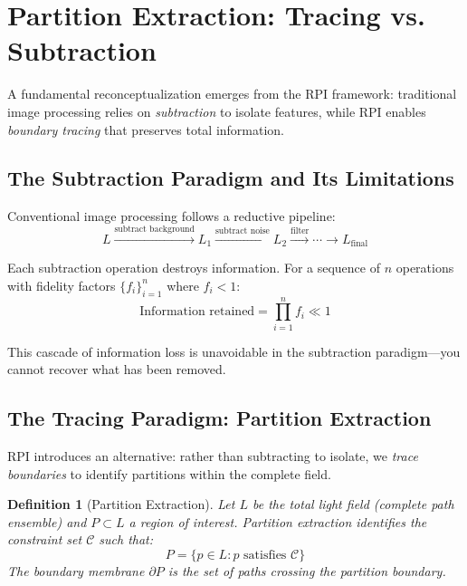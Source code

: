\documentclass[twocolumn,10pt,a4paper]{article}
\newtheorem{definition}[theorem]{Definition}
\begin{document}
\section{Partition Extraction: Tracing vs. Subtraction}

A fundamental reconceptualization emerges from the RPI framework: traditional image processing relies on \emph{subtraction} to isolate features, while RPI enables \emph{boundary tracing} that preserves total information.

\subsection{The Subtraction Paradigm and Its Limitations}

Conventional image processing follows a reductive pipeline:
\begin{equation}
L \xrightarrow{\text{subtract background}} L_1 \xrightarrow{\text{subtract noise}} L_2 \xrightarrow{\text{filter}} \cdots \xrightarrow{} L_{\text{final}}
\end{equation}

Each subtraction operation destroys information. For a sequence of $n$ operations with fidelity factors $\{f_i\}_{i=1}^n$ where $f_i < 1$:
\begin{equation}
\text{Information retained} = \prod_{i=1}^n f_i \ll 1
\end{equation}

This cascade of information loss is unavoidable in the subtraction paradigm---you cannot recover what has been removed.

\subsection{The Tracing Paradigm: Partition Extraction}

RPI introduces an alternative: rather than subtracting to isolate, we \emph{trace boundaries} to identify partitions within the complete field.

\begin{definition}[Partition Extraction]
Let $L$ be the total light field (complete path ensemble) and $P \subset L$ a region of interest. Partition extraction identifies the constraint set $\mathcal{C}$ such that:
\begin{equation}
P = \{p \in L : p \text{ satisfies } \mathcal{C}\}
\end{equation}
The boundary membrane $\partial P$ is the set of paths crossing the partition boundary.
\end{definition}
\end{document}
